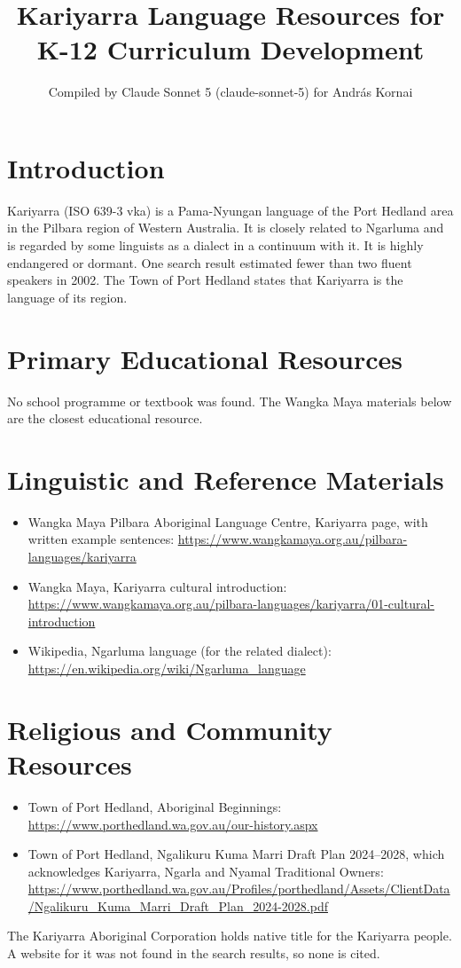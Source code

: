 \documentclass[12pt]{article}
\title{Kariyarra Language Resources for K-12 Curriculum Development}
\author{Compiled by Claude Sonnet 5 (claude-sonnet-5) for Andr\'as Kornai}
\date{}
\begin{document}
\maketitle

\section{Introduction}
Kariyarra (ISO 639-3 vka) is a Pama-Nyungan language of the Port Hedland area in the Pilbara region of Western Australia. It is closely related to Ngarluma and is regarded by some linguists as a dialect in a continuum with it. It is highly endangered or dormant. One search result estimated fewer than two fluent speakers in 2002. The Town of Port Hedland states that Kariyarra is the language of its region.

\section{Primary Educational Resources}
No school programme or textbook was found. The Wangka Maya materials below are the closest educational resource.

\section{Linguistic and Reference Materials}
\begin{itemize}
\item Wangka Maya Pilbara Aboriginal Language Centre, Kariyarra page, with written example sentences: \url{https://www.wangkamaya.org.au/pilbara-languages/kariyarra}
\item Wangka Maya, Kariyarra cultural introduction: \url{https://www.wangkamaya.org.au/pilbara-languages/kariyarra/01-cultural-introduction}
\item Wikipedia, Ngarluma language (for the related dialect): \url{https://en.wikipedia.org/wiki/Ngarluma_language}
\end{itemize}

\section{Religious and Community Resources}
\begin{itemize}
\item Town of Port Hedland, Aboriginal Beginnings: \url{https://www.porthedland.wa.gov.au/our-history.aspx}
\item Town of Port Hedland, Ngalikuru Kuma Marri Draft Plan 2024--2028, which acknowledges Kariyarra, Ngarla and Nyamal Traditional Owners: \url{https://www.porthedland.wa.gov.au/Profiles/porthedland/Assets/ClientData/Ngalikuru_Kuma_Marri_Draft_Plan_2024-2028.pdf}
\end{itemize}
The Kariyarra Aboriginal Corporation holds native title for the Kariyarra people. A website for it was not found in the search results, so none is cited.
\end{document}
